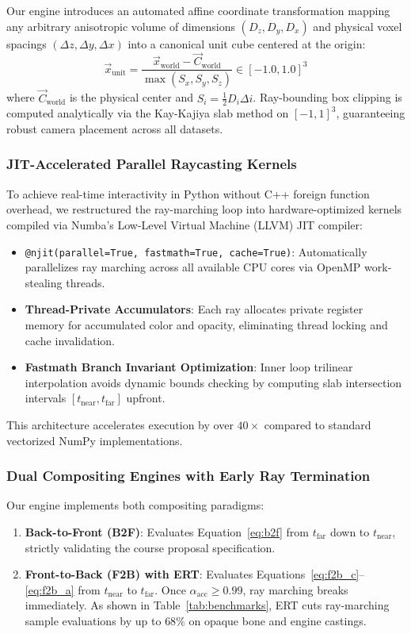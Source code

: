 \documentclass[10pt,twocolumn,a4paper]{article}
\begin{document}
Our engine introduces an automated affine coordinate transformation mapping any arbitrary anisotropic volume of dimensions $(D_z, D_y, D_x)$ and physical voxel spacings $(\Delta z, \Delta y, \Delta x)$ into a canonical unit cube centered at the origin:
\begin{equation}
\vec{x}_{\text{unit}} = \frac{\vec{x}_{\text{world}} - \vec{C}_{\text{world}}}{\max(S_x, S_y, S_z)} \in [-1.0, 1.0]^3
\end{equation}
where $\vec{C}_{\text{world}}$ is the physical center and $S_i = \frac{1}{2} D_i \Delta i$. Ray-bounding box clipping is computed analytically via the Kay-Kajiya slab method on $[-1, 1]^3$, guaranteeing robust camera placement across all datasets.

\subsubsection{JIT-Accelerated Parallel Raycasting Kernels}
To achieve real-time interactivity in Python without C++ foreign function overhead, we restructured the ray-marching loop into hardware-optimized kernels compiled via Numba's Low-Level Virtual Machine (LLVM) JIT compiler:
\begin{itemize}
    \item \texttt{@njit(parallel=True, fastmath=True, cache=True)}: Automatically parallelizes ray marching across all available CPU cores via OpenMP work-stealing threads.
    \item \textbf{Thread-Private Accumulators}: Each ray allocates private register memory for accumulated color and opacity, eliminating thread locking and cache invalidation.
    \item \textbf{Fastmath Branch Invariant Optimization}: Inner loop trilinear interpolation avoids dynamic bounds checking by computing slab intersection intervals $[t_{\text{near}}, t_{\text{far}}]$ upfront.
\end{itemize}
This architecture accelerates execution by over $40\times$ compared to standard vectorized NumPy implementations.

\subsubsection{Dual Compositing Engines with Early Ray Termination}
Our engine implements both compositing paradigms:
\begin{enumerate}
    \item \textbf{Back-to-Front (B2F)}: Evaluates Equation~\eqref{eq:b2f} from $t_{\text{far}}$ down to $t_{\text{near}}$, strictly validating the course proposal specification.
    \item \textbf{Front-to-Back (F2B) with ERT}: Evaluates Equations~\eqref{eq:f2b_c}--\eqref{eq:f2b_a} from $t_{\text{near}}$ to $t_{\text{far}}$. Once $\alpha_{\text{acc}} \ge 0.99$, ray marching breaks immediately. As shown in Table~\ref{tab:benchmarks}, ERT cuts ray-marching sample evaluations by up to $68\%$ on opaque bone and engine castings.
\end{enumerate}
\end{document}
